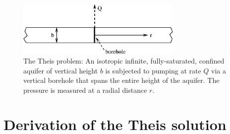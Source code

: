 \documentclass[]{scrreprt}
\begin{document}
\begin{figure}[htb]
\begin{center}
\includegraphics[width=8cm]{th.setup.eps}
\caption{The Theis problem: An isotropic infinite, fully-saturated,
  confined aquifer of vertical height $b$ is subjected to pumping at
  rate $Q$ via a vertical borehole that spans the entire height of the
  aquifer.  The pressure is measured at a radial distance $r$.}
\label{th.setup.fig}
\end{center}
\end{figure}

\section{Derivation of the Theis solution}
\end{document}
